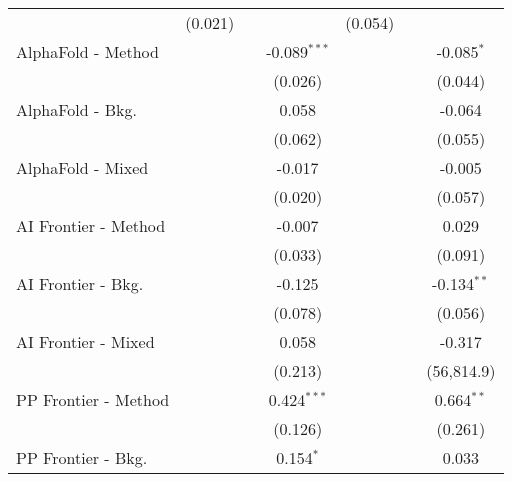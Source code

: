\begin{tabular}{lcccccc}
                                  & (0.021)        &                &                & (0.054)        &              &   \\   
   AlphaFold - Method             &                &                & -0.089$^{***}$ &                &              & -0.085$^{*}$\\   
                                  &                &                & (0.026)        &                &              & (0.044)\\   
   AlphaFold - Bkg.               &                &                & 0.058          &                &              & -0.064\\   
                                  &                &                & (0.062)        &                &              & (0.055)\\   
   AlphaFold - Mixed              &                &                & -0.017         &                &              & -0.005\\   
                                  &                &                & (0.020)        &                &              & (0.057)\\   
   AI Frontier - Method           &                &                & -0.007         &                &              & 0.029\\   
                                  &                &                & (0.033)        &                &              & (0.091)\\   
   AI Frontier - Bkg.             &                &                & -0.125         &                &              & -0.134$^{**}$\\   
                                  &                &                & (0.078)        &                &              & (0.056)\\   
   AI Frontier - Mixed            &                &                & 0.058          &                &              & -0.317\\   
                                  &                &                & (0.213)        &                &              & (56,814.9)\\   
   PP Frontier - Method           &                &                & 0.424$^{***}$  &                &              & 0.664$^{**}$\\   
                                  &                &                & (0.126)        &                &              & (0.261)\\   
   PP Frontier - Bkg.             &                &                & 0.154$^{*}$    &                &              & 0.033\\   

\end{tabular}
